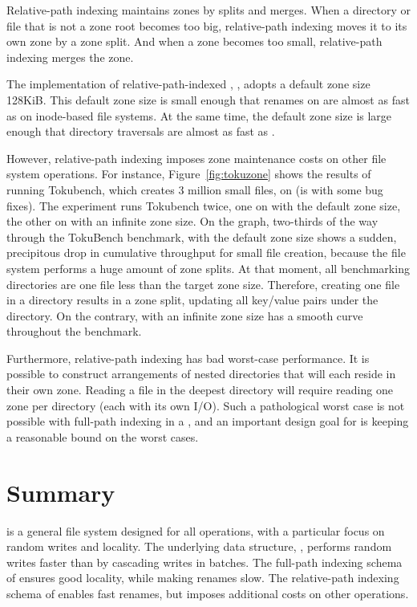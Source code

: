 Relative-path indexing maintains zones by splits and merges.
When a directory or file that is not a zone root becomes too big,
relative-path indexing moves it to its own zone by a zone split.
And when a zone becomes too small, relative-path indexing merges the zone.

The implementation of relative-path-indexed \betrfs, \betrfsTwo, adopts a
default zone size 128KiB.
This default zone size is small enough that renames on \betrfsTwo are almost
as fast as on inode-based file systems.
At the same time, the default zone size is large enough that directory
traversals are almost as fast as \betrfsOne.

However, relative-path indexing imposes zone maintenance costs on other file
system operations.
For instance, Figure~\ref{fig:tokuzone} shows the results of running Tokubench,
which creates 3 million small files, on \betrfsThree
(\betrfsThree is \betrfsTwo with some bug fixes).
The experiment runs Tokubench twice,
one on \betrfsThree with the default zone size,
the other on \betrfsThree with an infinite zone size.
On the graph, two-thirds of the way through the TokuBench benchmark,
\betrfsThree with the default zone size shows a sudden,
precipitous drop in cumulative throughput for small file creation,
because the file system performs a huge amount of zone splits.
At that moment, all benchmarking directories are one file less than the target
zone size.
Therefore, creating one file in a directory results in a zone split,
updating all key/value pairs under the directory.
On the contrary, \betrfsThree with an infinite zone size
has a smooth curve throughout the benchmark.

Furthermore, relative-path indexing has bad worst-case performance.
It is possible to construct arrangements of nested directories that will each
reside in their own zone.
Reading a file in the deepest directory will require reading one zone per
directory (each with its own I/O).
Such a pathological worst case is not possible with full-path indexing in a
\bet, and an important design goal for \betrfs is keeping a reasonable bound on
the worst cases.

\section{Summary}

\betrfs is a general file system designed for all operations, with a particular
focus on random writes and locality.
The underlying data structure, \bets, performs random writes faster than \btrees
by cascading writes in batches.
The full-path indexing schema of \betrfsOne ensures good locality, while making
renames slow.
The relative-path indexing schema of \betrfsTwo enables fast renames,
but imposes additional costs on other operations.

